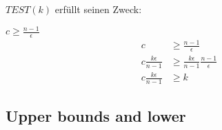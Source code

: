 \documentclass{beamer}
\begin{document}
\begin{frame}
   \frametitle{\insertsection}
   \framesubtitle{\insertsubsection}

   $TEST(k)$ erfüllt seinen Zweck:
   \begin{block}{$c\geq\frac{n-1}{\epsilon}$}
      \begin{align*}
         c & \ge \frac{n-1}{\epsilon} \\
         c \frac{k\epsilon}{n-1} & \ge \frac{k\epsilon}{n-1}\frac{n-1}{\epsilon} \\
         c \frac{k\epsilon}{n-1} & \ge k
      \end{align*}
   \end{block}
\end{frame}

\begin{frame}
   \frametitle{\insertsection}
   \framesubtitle{\insertsubsection}
\end{frame}

\subsection{Upper bounds and lower}
\end{document}

